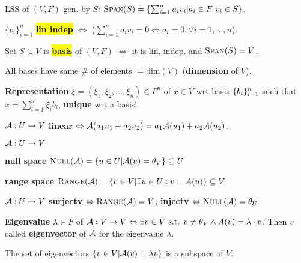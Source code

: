 \begin{Definition}
LSS of $(V,F)$ gen. by $S$: $\textsc{Span}(S)=\left\{ \sum_{i=1}^n{a_iv_i}|a_i\in F, v_i\in S \right\}$.
\end{Definition}
\begin{Definition}
$\{v_i\}_{i=1}^n$ \textbf{\hl{lin indep}} $\Leftrightarrow$ ($\sum_{i=1}^n{a_i v_i}=0\Leftrightarrow a_i=0, \forall i=1,\ldots,n$).
\end{Definition}
\begin{Definition}
Set $S\subseteq V$ is \textbf{\hl{basis}} of $(V,F)$ $\Leftrightarrow$ it is lin. indep. and $\textsc{Span}(S)=V$.
\end{Definition}
\begin{Fact}
All bases have same \# of elements $=\text{dim}(V)$ (\textbf{dimension} of $V$).
\end{Fact}
\begin{Definition}
\textbf{Representation} $\xi=(\xi_1,\xi_2,\ldots,\xi_n)\in F^n$ of $x\in V$ wrt basis $\{b_{i}\}_{i=1}^{n}$ such that $x=\sum_{i=1}^n {\xi_i b_i}$, \textbf{unique} wrt a basis!
\end{Definition}
\begin{Definition}
$\mathcal{A}:U\to V$ \textbf{linear} $\Leftrightarrow\mathcal{A}(a_1u_1+a_2u_2)=a_1\mathcal{A}(u_1)+a_2\mathcal{A}(u_2)$.
\end{Definition}
\begin{Definition}
$\mathcal{A}:U\to V$ \begin{itemize*} \item \textbf{null space} $\textsc{Null}(\mathcal{A})=\{u\in U|\mathcal{A}(u)=\theta_V\}\subseteq U$
\item \textbf{range space} $\textsc{Range}(\mathcal{A})=\{v\in V|\exists u\in U:v=A(u)\}\subseteq V$
\end{itemize*}
\end{Definition}
\begin{Theorem}
$\mathcal{A}:U\to V$ \textbf{surjectv} $\Leftrightarrow\textsc{Range}(\mathcal{A})=V$; \textbf{injectv} $\Leftrightarrow\textsc{Null}(\mathcal{A})=\theta_U$
\end{Theorem}
\begin{Definition}
\textbf{Eigenvalue} $\lambda\in F$ of $\mathcal{A}:V\to V\Leftrightarrow\exists v\in V\text{ s.t. }v\ne\theta_V\wedge A(v)=\lambda\cdot v$. Then $v$ called \textbf{eigenvector} of $\mathcal{A}$ for the eigenvalue $\lambda$.
\end{Definition}
\begin{Fact}
The set of eigenvectors $\{v\in V|\mathcal{A}(v)=\lambda v\}$ is a subspace of $V$.
\end{Fact}
